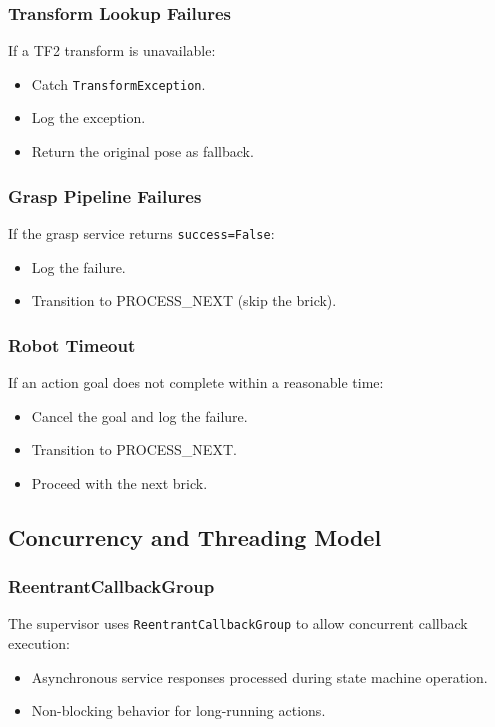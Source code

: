 \subsubsection{Transform Lookup Failures}

If a TF2 transform is unavailable:
\begin{itemize}
    \item Catch \texttt{TransformException}.
    \item Log the exception.
    \item Return the original pose as fallback.
\end{itemize}

\subsubsection{Grasp Pipeline Failures}

If the grasp service returns \texttt{success=False}:
\begin{itemize}
    \item Log the failure.
    \item Transition to PROCESS\_NEXT (skip the brick).
\end{itemize}

\subsubsection{Robot Timeout}

If an action goal does not complete within a reasonable time:
\begin{itemize}
    \item Cancel the goal and log the failure.
    \item Transition to PROCESS\_NEXT.
    \item Proceed with the next brick.
\end{itemize}

\subsection{Concurrency and Threading Model}

\subsubsection{ReentrantCallbackGroup}

The supervisor uses \texttt{ReentrantCallbackGroup} to allow concurrent callback execution:
\begin{itemize}
    \item Asynchronous service responses processed during state machine operation.
    \item Non-blocking behavior for long-running actions.
\end{itemize}

